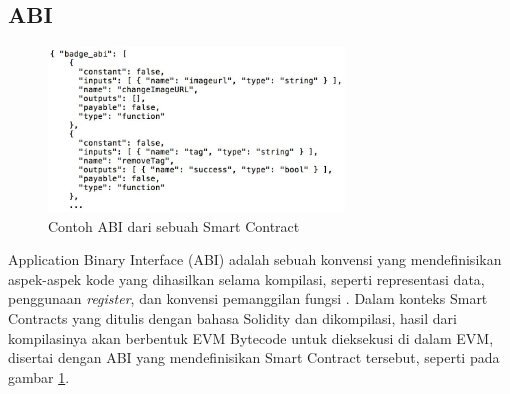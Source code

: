 \subsection{ABI}
\label{subsec:abi}

\begin{figure}[ht]
	\centering
	\includegraphics[width=0.7\textwidth]{resources/chapter-2/smart-contract-abi.jpg}
	\caption{Contoh ABI dari sebuah Smart Contract \parencite{third2017linked}}
	\label{image:abi-example}
\end{figure}

Application Binary Interface (ABI) adalah sebuah konvensi yang mendefinisikan aspek-aspek kode yang dihasilkan selama kompilasi, seperti representasi data, penggunaan \textit{register}, dan konvensi pemanggilan fungsi \parencite{sciencedirect2024}. Dalam konteks Smart Contracts yang ditulis dengan bahasa Solidity dan dikompilasi, hasil dari kompilasinya akan berbentuk EVM Bytecode untuk dieksekusi di dalam EVM, disertai dengan ABI yang mendefinisikan Smart Contract tersebut, seperti pada gambar \ref{image:abi-example}.